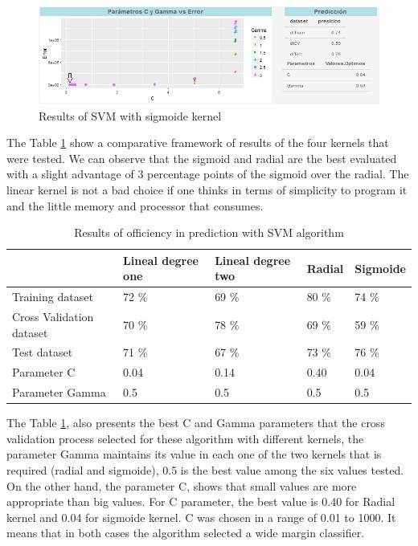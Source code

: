 \documentclass[]{book}
\begin{document}
\begin{figure}[H]

{\centering \includegraphics[width=0.8\linewidth]{images/SVM-sigmoide-2-flecha} 

}

\caption{Results of SVM with sigmoide kernel}\label{fig:SVM-sigmoide-2-flecha}
\end{figure}

The Table \ref{tab:results-of-efficiency-svm} show a comparative
framework of results of the four kernels that were tested. We can
observe that the sigmoid and radial are the best evaluated with a slight
advantage of 3 percentage points of the sigmoid over the radial. The
linear kernel is not a bad choice if one thinks in terms of simplicity
to program it and the little memory and processor that consumes.

\begin{table}[ht]
\centering
\caption{Results of officiency in prediction with SVM algorithm}
\label{tab:results-of-efficiency-svm}
\begin{tabular}{lllll}
\hline
                         & Lineal degree one & Lineal degree two & Radial & Sigmoide \\ \hline
Training dataset         & 72 \%             & 69 \%             & 80 \%  & 74 \%    \\
Cross Validation dataset & 70 \%             & 78 \%             & 69 \%  & 59 \%    \\
Test dataset             & 71 \%             & 67 \%             & 73 \%  & 76 \%    \\
Parameter C              & 0.04              & 0.14              & 0.40   & 0.04     \\
Parameter Gamma          & 0.5               & 0.5               & 0.5    & 0.5      \\ \hline
\end{tabular}
\end{table}

The Table \ref{tab:results-of-efficiency-svm}, also presents the best C
and Gamma parameters that the cross validation process selected for
these algorithm with different kernels, the parameter Gamma maintains
its value in each one of the two kernels that is required (radial and
sigmoide), 0.5 is the best value among the six values tested. On the
other hand, the parameter C, shows that small values are more
appropriate than big values. For C parameter, the best value is 0.40 for
Radial kernel and 0.04 for sigmoide kernel. C was chosen in a range of
0.01 to 1000. It means that in both cases the algorithm selected a wide
margin classifier.
\end{document}
